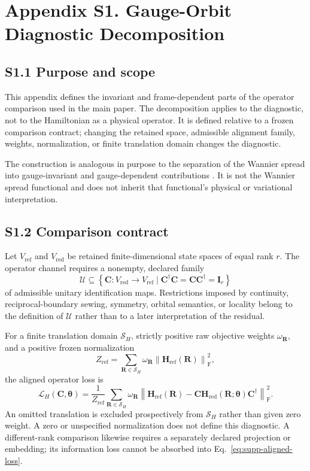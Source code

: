 \section*{Appendix S1. Gauge-Orbit Diagnostic Decomposition}
\label{supp:orbit-diagnostic}
\renewcommand{\theequation}{S1.\arabic{equation}}
\setcounter{equation}{0}

\subsection*{S1.1 Purpose and scope}

This appendix defines the invariant and frame-dependent parts of the operator
comparison used in the main paper. The decomposition applies to the diagnostic,
not to the Hamiltonian as a physical operator. It is defined relative to a
frozen comparison contract; changing the retained space, admissible alignment
family, weights, normalization, or finite translation domain changes the
diagnostic.

The construction is analogous in purpose to the separation of the Wannier
spread into gauge-invariant and gauge-dependent contributions
\cite{marzari1997,marzari2012,panati2013}. It is not the Wannier spread
functional and does not inherit that functional's physical or variational
interpretation.

\subsection*{S1.2 Comparison contract}

Let $V_{\mathrm{ref}}$ and $V_{\mathrm{red}}$ be retained finite-dimensional
state spaces of equal rank $r$. The operator channel requires a nonempty,
declared family
\[
 \mathcal U\subseteq
 \left\{\bm C:V_{\mathrm{red}}\rightarrow V_{\mathrm{ref}}
 \mid \bm C^\dagger\bm C=\bm C\bm C^\dagger=\bm I_r\right\}
\]
of admissible unitary identification maps. Restrictions imposed by continuity,
reciprocal-boundary sewing, symmetry, orbital semantics, or locality belong to
the definition of $\mathcal U$ rather than to a later interpretation of the
residual.

For a finite translation domain $\mathcal S_H$, strictly positive raw objective
weights $\omega_{\bm R}$, and a positive frozen normalization
\[
 Z_{\mathrm{ref}}=
 \sum_{\bm R\in\mathcal S_H}\omega_{\bm R}
 \left\|\bm H_{\mathrm{ref}}(\bm R)\right\|_{\mathrm F}^2,
\]
the aligned operator loss is
\begin{equation}
 \mathcal L_H(\bm C,\bm\theta)=
 \frac{1}{Z_{\mathrm{ref}}}
 \sum_{\bm R\in\mathcal S_H}\omega_{\bm R}
 \left\|
 \bm H_{\mathrm{ref}}(\bm R)
 -\bm C\bm H_{\mathrm{red}}(\bm R;\bm\theta)\bm C^\dagger
 \right\|_{\mathrm F}^2.
 \label{eq:supp-aligned-loss}
\end{equation}
An omitted translation is excluded prospectively from $\mathcal S_H$ rather
than given zero weight. A zero or unspecified normalization does not define
this diagnostic. A different-rank comparison likewise requires a separately
declared projection or embedding; its information loss cannot be absorbed into
Eq.~\eqref{eq:supp-aligned-loss}.

